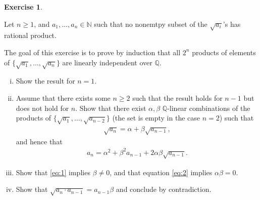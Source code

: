 \documentclass[12pt,a4paper]{article}
\theoremstyle{plain}
\newtheorem*{Sol*}{Solution}
\theoremstyle{definition}
\newtheorem{Ex}{Exercise}
\def \N {\mathbb N}
\def \Q {\mathbb Q}
\newif\ifsolutions
\newcommand{\exercise}[2]{
			\begin{Ex} #1 \end{Ex}
			\ifsolutions  \begin{Sol*} #2 \end{Sol*} \bigskip \else \bigskip  \fi
		}
\begin{document}
\exercise{\label{ex:1}

	Let $n\geq1$, and $a_1, \dots, a_n \in \N$ such that no nonemtpy subset of the $\sqrt{a_i}$'s has rational product.

	The goal of this exercise is to prove by induction that all $2^n$ products of elements of $\{ \sqrt{a_1}, \dots, \sqrt{a_n} \}$ are linearly independent over $\Q$.

	\begin{enumerate}[i)]

		\item 
		Show the result for $n=1$.

		\item Assume that there exists some $n \geq 2$ such that the result holds for $n-1$ but does not hold for $n$.
		Show that there exist $\alpha, \beta$ $\Q$-linear combinations of the products of $\{ \sqrt{a_1}, \dots, \sqrt{a_{n-2}} \}$ (the set is empty in the case $n=2$) such that
			\begin{align}\label{eq:1}
				 \sqrt{a_n} = \alpha + \beta \sqrt{a_{n-1}},
			\end{align}
		and hence that
			\begin{align}\label{eq:2}
				a_n = \alpha^2 + \beta^2 a_{n-1} + 2 \alpha \beta \sqrt{a_{n-1}}.
			\end{align}

		\item Show that \eqref{eq:1} implies $\beta \neq 0$, and that equation \eqref{eq:2} implies $\alpha\beta = 0$.

		\item Show that $\sqrt{a_n \cdot a_{n-1}} = a_{n-1} \beta$ and conclude by contradiction.
	\end{enumerate}

}{
	\begin{enumerate}
		\item For any $\Delta \in \N$ nonsquare integer, 1 and $\sqrt{\Delta}$ are independent over the rationals, since $\sqrt{\Delta}$ is an irrational number.

		\item A dependence relation must be of the form
			\[ \sqrt{a_n} \gamma = \delta, \]	
		with $\gamma, \delta \in \Q(\sqrt{a_1}, \dots, \sqrt{a_{n-1}}), \gamma \neq 0$.
		Dividing both sides by $\gamma$ and factoring by $\sqrt{a_{n-1}}$ concludes.

		\item If $\beta=0$ then relation \eqref{eq:1} is a dependence relation over $\Q(\sqrt{a_1}, \dots, \sqrt{a_{n-2}}, \sqrt{a_n})$, which cannot happen by assumption that the result holds for $n-1$.


\end{enumerate}}
\end{document}
